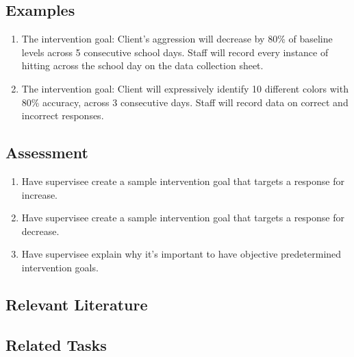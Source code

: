 \subsection{Examples}
\begin{enumerate}
\item The intervention goal: Client's aggression will decrease by 80\% of baseline levels across 5 consecutive school days. Staff will record every instance of hitting across the school day on the data collection sheet. 
\item The intervention goal: Client will expressively identify 10 different colors with 80\% accuracy, across 3 consecutive days. Staff will record data on correct and incorrect responses.
\end{enumerate}
%
\subsection{Assessment}
\begin{enumerate}
\item Have supervisee create a sample intervention goal that targets a response for increase. 
\item Have supervisee create a sample intervention goal that targets a response for decrease.
\item Have supervisee explain why it's important to have objective predetermined intervention goals.
\end{enumerate}
%
\subsection{Relevant Literature}
\begin{refsection}
\nocite{test,alang2017police,clayton2018black}
\printbibliography[heading=none]
\end{refsection}
%
\subsection{Related Tasks}
\fourbOne{}\\ 
\fouriOne{}\\
\fouriTwo{}\\
\fourFKSeven{}\\
%
%
%
%
%
%
%
\section[\fourjTwo{}]{\fourjTwo{}%
              }

